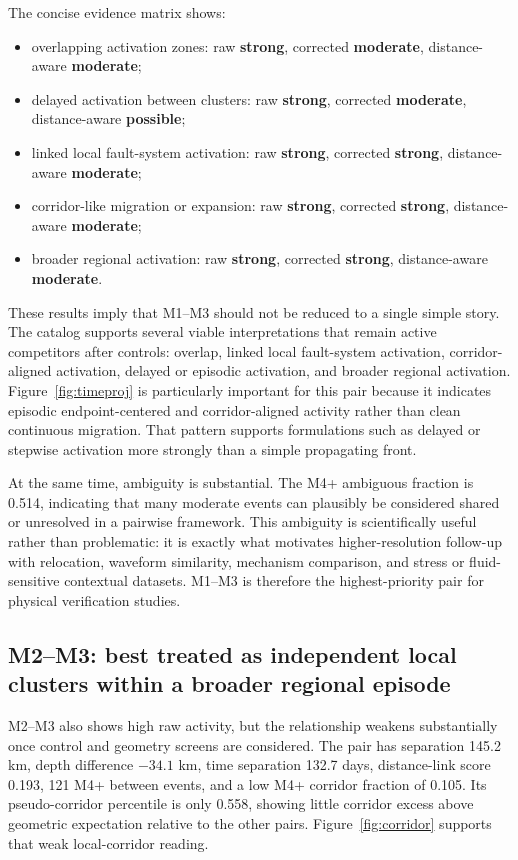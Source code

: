 \documentclass[11pt]{article}
\begin{document}
The concise evidence matrix shows:
\begin{itemize}
    \item overlapping activation zones: raw \textbf{strong}, corrected \textbf{moderate}, distance-aware \textbf{moderate};
    \item delayed activation between clusters: raw \textbf{strong}, corrected \textbf{moderate}, distance-aware \textbf{possible};
    \item linked local fault-system activation: raw \textbf{strong}, corrected \textbf{strong}, distance-aware \textbf{moderate};
    \item corridor-like migration or expansion: raw \textbf{strong}, corrected \textbf{strong}, distance-aware \textbf{moderate};
    \item broader regional activation: raw \textbf{strong}, corrected \textbf{strong}, distance-aware \textbf{moderate}.
\end{itemize}

These results imply that M1--M3 should not be reduced to a single simple story. The catalog supports several viable interpretations that remain active competitors after controls: overlap, linked local fault-system activation, corridor-aligned activation, delayed or episodic activation, and broader regional activation. Figure~\ref{fig:timeproj} is particularly important for this pair because it indicates episodic endpoint-centered and corridor-aligned activity rather than clean continuous migration. That pattern supports formulations such as delayed or stepwise activation more strongly than a simple propagating front.

At the same time, ambiguity is substantial. The M4+ ambiguous fraction is 0.514, indicating that many moderate events can plausibly be considered shared or unresolved in a pairwise framework. This ambiguity is scientifically useful rather than problematic: it is exactly what motivates higher-resolution follow-up with relocation, waveform similarity, mechanism comparison, and stress or fluid-sensitive contextual datasets. M1--M3 is therefore the highest-priority pair for physical verification studies.

\subsection{M2--M3: best treated as independent local clusters within a broader regional episode}
M2--M3 also shows high raw activity, but the relationship weakens substantially once control and geometry screens are considered. The pair has separation 145.2 km, depth difference $-34.1$ km, time separation 132.7 days, distance-link score 0.193, 121 M4+ between events, and a low M4+ corridor fraction of 0.105. Its pseudo-corridor percentile is only 0.558, showing little corridor excess above geometric expectation relative to the other pairs. Figure~\ref{fig:corridor} supports that weak local-corridor reading.
\end{document}
